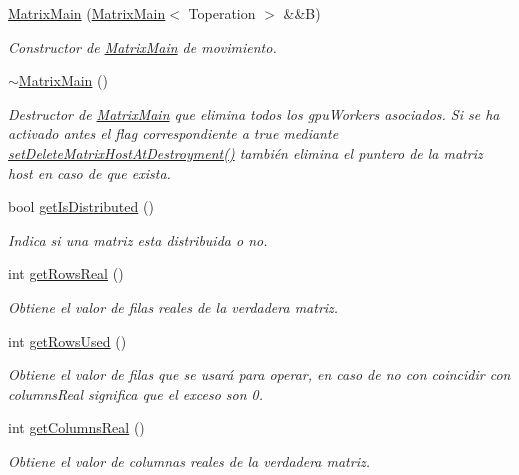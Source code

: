 \begin{DoxyCompactItemize}
\hyperlink{classMatrixMain_ac4a0bd559991c8372bb6a782d646c328}{Matrix\+Main} (\hyperlink{classMatrixMain}{Matrix\+Main}$<$ Toperation $>$ \&\&B)
\begin{DoxyCompactList}\small\item\em Constructor de \hyperlink{classMatrixMain}{Matrix\+Main} de movimiento. \end{DoxyCompactList}\item 
\mbox{\label{classMatrixMain_a82f27375e3180a2894633a5b6477529d}} 
\hyperlink{classMatrixMain_a82f27375e3180a2894633a5b6477529d}{$\sim$\+Matrix\+Main} ()
\begin{DoxyCompactList}\small\item\em Destructor de \hyperlink{classMatrixMain}{Matrix\+Main} que elimina todos los gpu\+Workers asociados. Si se ha activado antes el flag correspondiente a true mediante \hyperlink{classMatrixMain_a9c8cf3be535a8bb042f6ee0ddaafc6b1}{set\+Delete\+Matrix\+Host\+At\+Destroyment()} también elimina el puntero de la matriz host en caso de que exista. \end{DoxyCompactList}\item 
bool \hyperlink{classMatrixMain_aaa158ccbaecfba4cbafa36bc424f321e}{get\+Is\+Distributed} ()
\begin{DoxyCompactList}\small\item\em Indica si una matriz esta distribuida o no. \end{DoxyCompactList}\item 
int \hyperlink{classMatrixMain_a0d936d844e9b03ff05979220be754461}{get\+Rows\+Real} ()
\begin{DoxyCompactList}\small\item\em Obtiene el valor de filas reales de la verdadera matriz. \end{DoxyCompactList}\item 
int \hyperlink{classMatrixMain_a51fbed871925f5f34b40b0a264b4eff6}{get\+Rows\+Used} ()
\begin{DoxyCompactList}\small\item\em Obtiene el valor de filas que se usará para operar, en caso de no con coincidir con columns\+Real significa que el exceso son 0. \end{DoxyCompactList}\item 
int \hyperlink{classMatrixMain_aae0f90b2eaf866d16b3e3ade9170dab4}{get\+Columns\+Real} ()
\begin{DoxyCompactList}\small\item\em Obtiene el valor de columnas reales de la verdadera matriz. \end{DoxyCompactList}\item 

\end{DoxyCompactItemize}
